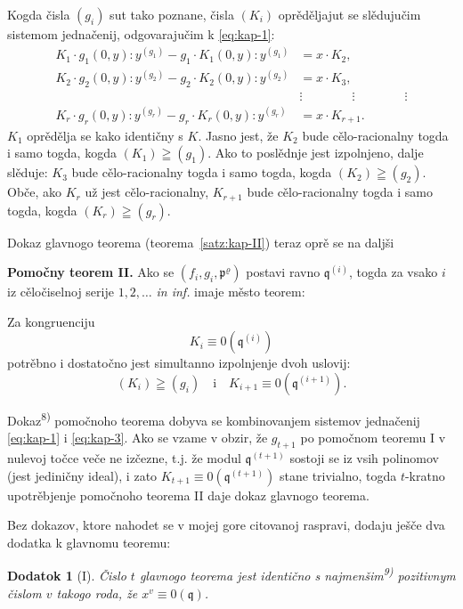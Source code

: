 \documentclass[11pt]{article}
\theoremstyle{plain}
\newtheorem{zusatz}{Dodatok}
\begin{document}
Kogda čisla $(g_{i})$ sut tako poznane, čisla $(K_{i})$ oprěděljajut
se slědujučim sistemom jednačenij, odgovarajučim k \eqref{eq:kap-1}:
\begin{equation}\label{eq:kap-3}
\begin{aligned}
K_{1}\cdot g_{1}(0,y):y^{(g_{1})} - g_{1}\cdot K_{1}(0,y):y^{(g_{1})} &= x\cdot K_{2},\\
K_{2}\cdot g_{2}(0,y):y^{(g_{2})} - g_{2}\cdot K_{2}(0,y):y^{(g_{2})} &= x\cdot K_{3},\\
&\vdots \qquad\qquad\vdots\qquad\qquad\vdots\\
K_{r}\cdot g_{r}(0,y):y^{(g_{r})} - g_{r}\cdot K_{r}(0,y):y^{(g_{r})} &= x\cdot K_{r+1}.
\end{aligned}
\end{equation}
$K_{1}$ oprědělja se kako identičny s $K$. Jasno jest, že $K_{2}$
bude cělo-racionalny togda i samo togda, kogda
$(K_1)\geqq(g_1)$. Ako to poslědnje jest izpolnjeno, dalje
slěduje: $K_{3}$ bude cělo-racionalny togda i samo togda, kogda
$(K_2)\geqq(g_2)$. Obče, ako $K_{r}$ už jest cělo-racionalny,
$K_{r+1}$ bude cělo-racionalny togda i samo togda, kogda
$(K_r)\geqq(g_r)$.

Dokaz glavnogo teorema (teorema~\ref{satz:kap-II}) teraz oprě se na
daljši

\smallskip
\textbf{Pomočny teorem II.} Ako se
$(f_i,g_i,\mathfrak{p}^\varrho)$ postavi ravno
$\mathfrak{q}^{(i)}$, togda za vsako $i$ iz cěločiselnoj serije
$1, 2, \ldots$ \textit{in inf.} imaje město teorem:

Za kongruenciju
\[
K_{i} \equiv 0(\mathfrak{q}^{(i)})
\]
potrěbno i dostatočno jest simultanno izpolnjenje dvoh uslovij:
\[
(K_i)\geqq(g_i)\quad \text{i}\quad K_{i+1}\equiv0(\mathfrak{q}^{(i+1)}).
\]

Dokaz\textsuperscript{8)} pomočnoho teorema dobyva se kombinovanjem
sistemov jednačenij \eqref{eq:kap-1} i \eqref{eq:kap-3}. Ako se
vzame v obzir, že $g_{t+1}$ po pomočnom teoremu I v nulevoj točce veče ne
izčezne, t.j. že modul $\mathfrak{q}^{(t+1)}$ sostoji se iz vsih
polinomov (jest jediničny ideal), i zato
$K_{t+1} \equiv 0(\mathfrak{q}^{(t+1)})$ stane trivialno, togda
$t$-kratno upotrěbjenje pomočnoho teorema II daje dokaz glavnogo
teorema.

\smallskip
Bez dokazov, ktore nahodet se v mojej gore citovanoj raspravi,
dodaju ješče dva dodatka k glavnomu teoremu:

\begin{zusatz}[I]
Čislo $t$ glavnogo teorema jest identično s najmenšim\textsuperscript{9)}
pozitivnym čislom $v$ takogo roda, že
$x^{v} \equiv 0(\mathfrak{q})$.
\end{zusatz}
\end{document}
